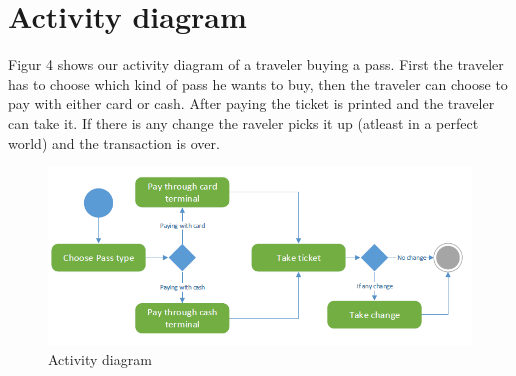 \documentclass[pdftex,12pt,a4paper]{article}
\begin{document}
\pagebreak

\section{Activity diagram}
Figur 4 shows our activity diagram of a traveler buying a pass. First the traveler has to choose which kind of pass he wants to buy, then the traveler can choose to pay with either card or cash. After paying the ticket is printed and the traveler can take it. If there is any change the raveler picks it up (atleast in a perfect world) and the transaction is over.
\begin{figure}[h]
\centering
\includegraphics[scale = 0.8]{activity.png}
\caption{Activity diagram}
\end{figure}
\end{document}
